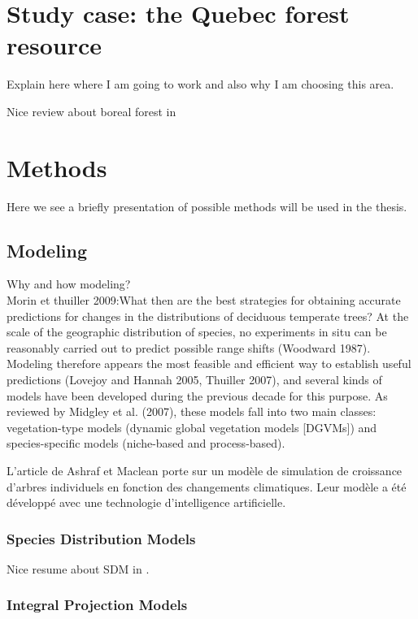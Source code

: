 \section{Study case: the Quebec forest resource}

Explain here where I am going to work and also why I am choosing this area.

Nice review about boreal forest in \parencite{Price2013}
\section{Methods}

Here we see a briefly presentation of possible methods will be used in the thesis.

\subsection{Modeling}

Why and how modeling?\\
Morin et thuiller 2009:{What then are the best strategies for obtaining accurate predictions for changes in the distributions of deciduous temperate trees? At the scale of the geographic distribution of species, no experiments in situ can be reasonably carried out to predict possible range shifts (Woodward 1987). Modeling therefore appears the most feasible and efficient way to establish useful predictions (Lovejoy and Hannah 2005, Thuiller 2007), and several kinds of models have been developed during the previous decade for this purpose. As reviewed by Midgley et al. (2007), these models fall into two main classes: vegetation-type models (dynamic global vegetation models [DGVMs]) and species-specific models (niche-based and process-based).}

 L’article de Ashraf et Maclean porte sur un modèle de simulation de croissance d’arbres individuels en fonction des changements climatiques.  Leur modèle a été développé avec une technologie d’intelligence artificielle.

\subsubsection{Species Distribution Models}\label{sdm}

Nice resume about SDM in \textcite{Moran-Ordonez2016}.

\subsubsection{Integral Projection Models}

